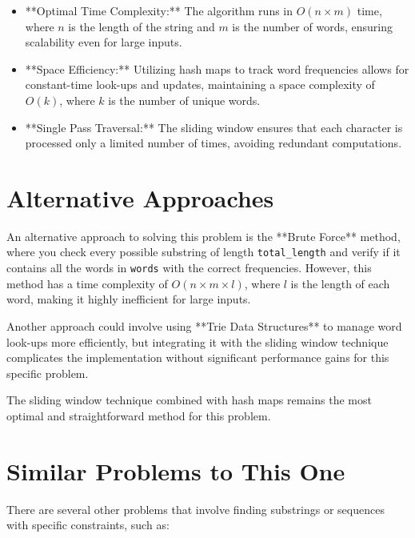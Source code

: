 \begin{itemize}
    \item **Optimal Time Complexity:** The algorithm runs in \(O(n \times m)\) time, where \(n\) is the length of the string and \(m\) is the number of words, ensuring scalability even for large inputs.
    \item **Space Efficiency:** Utilizing hash maps to track word frequencies allows for constant-time look-ups and updates, maintaining a space complexity of \(O(k)\), where \(k\) is the number of unique words.
    \item **Single Pass Traversal:** The sliding window ensures that each character is processed only a limited number of times, avoiding redundant computations.
\end{itemize}

\section*{Alternative Approaches}

An alternative approach to solving this problem is the **Brute Force** method, where you check every possible substring of length \texttt{total\_length} and verify if it contains all the words in \texttt{words} with the correct frequencies. However, this method has a time complexity of \(O(n \times m \times l)\), where \(l\) is the length of each word, making it highly inefficient for large inputs.

Another approach could involve using **Trie Data Structures** to manage word look-ups more efficiently, but integrating it with the sliding window technique complicates the implementation without significant performance gains for this specific problem.

The sliding window technique combined with hash maps remains the most optimal and straightforward method for this problem.


\section*{Similar Problems to This One}

There are several other problems that involve finding substrings or sequences with specific constraints, such as:

